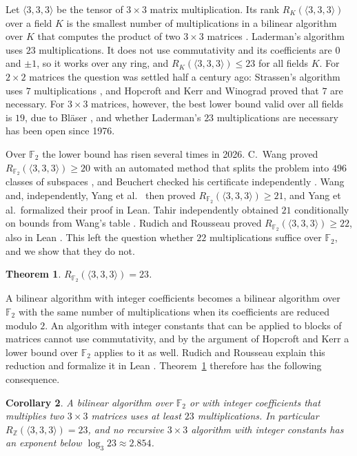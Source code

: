 \documentclass[11pt]{amsart}
\newtheorem{theorem}{Theorem}[section]
\newtheorem{corollary}[theorem]{Corollary}
\theoremstyle{definition}
\theoremstyle{remark}
\numberwithin{equation}{section}
\newcommand{\F}{\mathbb{F}_2}
\newcommand{\Z}{\mathbb{Z}}
\newcommand{\mm}{\langle 3,3,3\rangle}
\begin{document}
Let $\mm$ be the tensor of $3\times 3$ matrix multiplication. Its rank $R_K(\mm)$ over a field $K$ is the smallest number of multiplications in a bilinear algorithm over $K$ that computes the product of two $3\times 3$ matrices \cite[Ch.~14]{BCS97}. Laderman's algorithm \cite{Lad76} uses $23$ multiplications. It does not use commutativity and its coefficients are $0$ and $\pm1$, so it works over any ring, and $R_K(\mm)\le 23$ for all fields $K$. For $2\times 2$ matrices the question was settled half a century ago: Strassen's algorithm uses $7$ multiplications \cite{Str69}, and Hopcroft and Kerr \cite{HK71} and Winograd \cite{Win71} proved that $7$ are necessary. For $3\times 3$ matrices, however, the best lower bound valid over all fields is $19$, due to Bläser \cite{Bla03}, and whether Laderman's $23$ multiplications are necessary has been open since 1976.

Over $\F$ the lower bound has risen several times in 2026. C.~Wang proved $R_{\F}(\mm)\ge 20$ with an automated method that splits the problem into $496$ classes of subspaces \cite{Wan26a}, and Beuchert checked his certificate independently \cite{Beu26}. Wang \cite{Wan26b} and, independently, Yang et al.\ \cite{Yan26} then proved $R_{\F}(\mm)\ge 21$, and Yang et al.\ formalized their proof in Lean. Tahir independently obtained $21$ conditionally on bounds from Wang's table \cite{Tah26}. Rudich and Rousseau proved $R_{\F}(\mm)\ge 22$, also in Lean \cite{RR26}. This left the question whether $22$ multiplications suffice over $\F$, and we show that they do not.

\begin{theorem}\label{thm:main}
$R_{\F}(\mm)=23$.
\end{theorem}

A bilinear algorithm with integer coefficients becomes a bilinear algorithm over $\F$ with the same number of multiplications when its coefficients are reduced modulo $2$. An algorithm with integer constants that can be applied to blocks of matrices cannot use commutativity, and by the argument of Hopcroft and Kerr \cite{HK71} a lower bound over $\F$ applies to it as well. Rudich and Rousseau explain this reduction and formalize it in Lean \cite{RR26}. Theorem~\ref{thm:main} therefore has the following consequence.

\begin{corollary}\label{cor:integer}
A bilinear algorithm over $\F$ or with integer coefficients that multiplies two $3\times 3$ matrices uses at least $23$ multiplications. In particular $R_{\Z}(\mm)=23$, and no recursive $3\times3$ algorithm with integer constants has an exponent below $\log_3 23\approx 2.854$.
\end{corollary}
\end{document}
